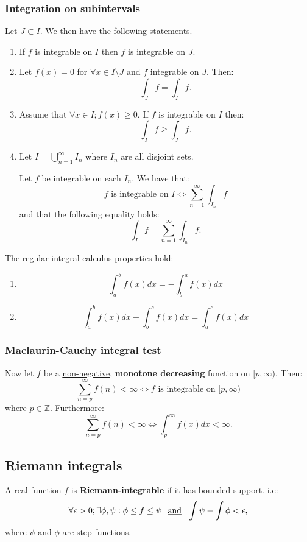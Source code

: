 \documentclass{article}
\begin{document}
\newpage

\subsubsection{Integration on subintervals}
Let $J\subset I$. We then have the following statements.
\begin{enumerate}
    \item If $f$ is integrable on $I$ then $f$ is integrable on $J$.

    \item Let $f(x)=0$ for $\forall x\in I\setminus J$ and $f$ integrable on $J$. Then:
    $$\int_J f=\int_I f.$$

    \item Assume that $\forall x\in I; f(x)\geq0$. If $f$ is integrable on $I$ then:
    $$\int_I f\geq\int_J f.$$

    \item Let $I=\displaystyle\bigcup_{n=1}^{\infty}I_n$ where $I_n$ are all disjoint sets.
    
    Let $f$ be integrable on each $I_n$. We have that:
    $$\text{$f$ is integrable on $I$}\iff\sum_{n=1}^{\infty}\int_{I_n}f$$
    and that the following equality holds:
    $$\int_I f=\sum_{n=1}^{\infty}\int_{I_n}f.$$
\end{enumerate}
The regular integral calculus properties hold:
\begin{enumerate}
    \item $$\int_{a}^{b}f(x)dx=-\int_{b}^{a}f(x)dx$$

    \item $$\int_{a}^{b}f(x)dx+\int_{b}^{c}f(x)dx=\int_{a}^{c}f(x)dx$$
\end{enumerate}

\subsubsection{Maclaurin-Cauchy integral test}
Now let $f$ be a \underline{non-negative}, \textbf{monotone decreasing} function on $[p,\infty)$. Then:
$$\sum_{n=p}^{\infty}f(n)<\infty\iff\text{$f$ is integrable on $[p,\infty)$}$$
where $p\in\mathbb{Z}$. Furthermore:
$$\sum_{n=p}^{\infty}f(n)<\infty\iff\int_{p}^{\infty}f(x)dx<\infty.$$

\newpage

\subsection{Riemann integrals}
A real function $f$ is \textbf{Riemann-integrable} if it has \underline{bounded support}. i.e:
$$\forall\epsilon>0; \exists\phi,\psi:\phi\leq f\leq\psi\hspace{0.1in}\text{\underline{and}}
\hspace{0.1in}\int\psi-\int\phi<\epsilon,$$
where $\psi$ and $\phi$ are step functions.
\end{document}

